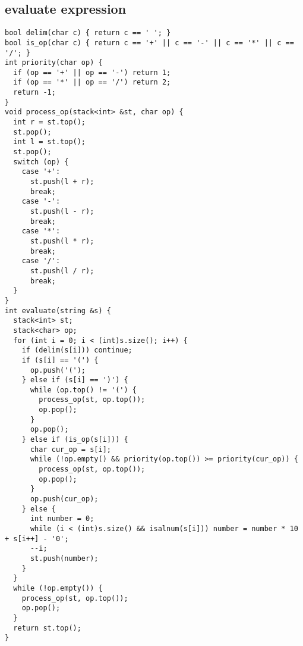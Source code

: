 \documentclass[twoside]{article}
\begin{document}
\begin{multicols*}{2}
{\subsection*{evaluate expression}
}
\begin{verbatim}
bool delim(char c) { return c == ' '; }
bool is_op(char c) { return c == '+' || c == '-' || c == '*' || c == '/'; }
int priority(char op) {
  if (op == '+' || op == '-') return 1;
  if (op == '*' || op == '/') return 2;
  return -1;
}
void process_op(stack<int> &st, char op) {
  int r = st.top();
  st.pop();
  int l = st.top();
  st.pop();
  switch (op) {
    case '+':
      st.push(l + r);
      break;
    case '-':
      st.push(l - r);
      break;
    case '*':
      st.push(l * r);
      break;
    case '/':
      st.push(l / r);
      break;
  }
}
int evaluate(string &s) {
  stack<int> st;
  stack<char> op;
  for (int i = 0; i < (int)s.size(); i++) {
    if (delim(s[i])) continue;
    if (s[i] == '(') {
      op.push('(');
    } else if (s[i] == ')') {
      while (op.top() != '(') {
        process_op(st, op.top());
        op.pop();
      }
      op.pop();
    } else if (is_op(s[i])) {
      char cur_op = s[i];
      while (!op.empty() && priority(op.top()) >= priority(cur_op)) {
        process_op(st, op.top());
        op.pop();
      }
      op.push(cur_op);
    } else {
      int number = 0;
      while (i < (int)s.size() && isalnum(s[i])) number = number * 10 + s[i++] - '0';
      --i;
      st.push(number);
    }
  }
  while (!op.empty()) {
    process_op(st, op.top());
    op.pop();
  }
  return st.top();
}
\end{verbatim}

{
}
\end{multicols*}
\end{document}
